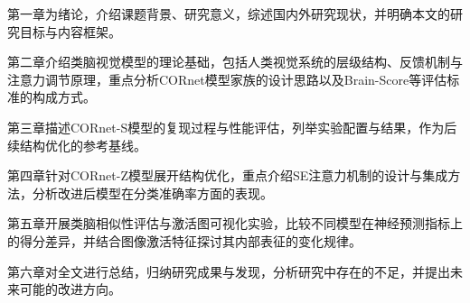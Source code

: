 第一章为绪论，介绍课题背景、研究意义，综述国内外研究现状，并明确本文的研究目标与内容框架。

第二章介绍类脑视觉模型的理论基础，包括人类视觉系统的层级结构、反馈机制与注意力调节原理，重点分析CORnet模型家族的设计思路以及Brain-Score等评估标准的构成方式。

第三章描述CORnet-S模型的复现过程与性能评估，列举实验配置与结果，作为后续结构优化的参考基线。

第四章针对CORnet-Z模型展开结构优化，重点介绍SE注意力机制的设计与集成方法，分析改进后模型在分类准确率方面的表现。

第五章开展类脑相似性评估与激活图可视化实验，比较不同模型在神经预测指标上的得分差异，并结合图像激活特征探讨其内部表征的变化规律。

第六章对全文进行总结，归纳研究成果与发现，分析研究中存在的不足，并提出未来可能的改进方向。

